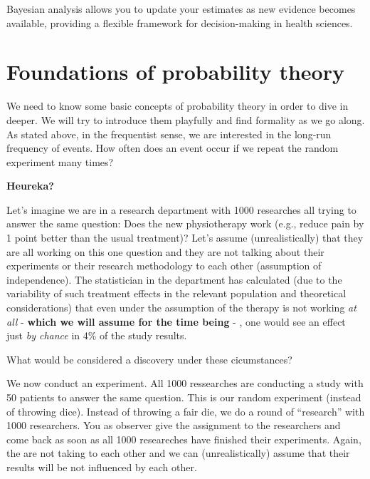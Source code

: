 \documentclass[
]{book}
\begin{document}
Bayesian analysis allows you to update your estimates as new evidence becomes available, providing a flexible framework for decision-making in health sciences.

\section{Foundations of probability theory}\label{foundations-of-probability-theory}

We need to know some basic concepts of probability theory in order to dive in deeper. We will try to introduce them playfully and find formality as we go along.
As stated above, in the frequentist sense, we are interested in the long-run frequency of events. How often does an event occur if we repeat the random experiment many times?

\textbf{Heureka?}

Let's imagine we are in a research department with 1000 researches all trying to answer the same question:
Does the new physiotherapy work (e.g., reduce pain by 1 point better than the usual treatment)? Let's assume (unrealistically) that they are all working on this one question and they are not
talking about their experiments or their research methodology to each other (assumption of independence). The statistician in the department has calculated
(due to the variability of such treatment effects in the relevant population and theoretical considerations)
that even under the assumption of the therapy is not working \emph{at all} - \textbf{which we will assume for the time being} - , one would see an effect just \emph{by chance} in 4\% of the study results.

What would be considered a discovery under these cicumstances?

We now conduct an experiment. All 1000 ressearches are conducting a study with 50 patients to answer the same question. This is our random experiment (instead of throwing dice).
Instead of throwing a fair die, we do a round of ``research'' with 1000 researchers. You as observer
give the assignment to the researchers and come back as soon as all 1000 researeches have finished their experiments. Again, the are not taking to each other and we can
(unrealistically) assume that their results will be not influenced by each other.
\end{document}
